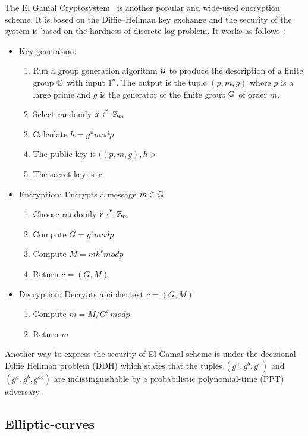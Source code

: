 The El Gamal Cryptosystem~\cite{el_gamal} is another popular and wide-used encryption scheme. It is based on the Diffie–Hellman key exchange and the security of the system is based on the hardness of discrete log problem. It works as follows~\cite{Katz:2014:IMC:2700550, kiagias:crypto}:

\begin{itemize}
  \item Key generation:
    \begin{enumerate}
        \item Run a group generation algorithm $\mathcal{G}$ to produce the description of a finite group $\mathbb{G}$ with input $1^{n}$. The output is the tuple $(p, m, g)$ where $p$ is a large prime and $g$ is the generator of the finite group $\mathbb{G}$ of order $m$.
        \item Select randomly $x \xleftarrow{\mathtt{r}}{\mathbb{Z}_m}$
        \item Calculate $h = g^{x}modp$
        \item The public key is $((p, m, g), h>$
        \item The secret key is $x$
    \end{enumerate}
  \item Encryption: Encrypts a message $m \in \mathbb{G}$
    \begin{enumerate}
      \item Choose randomly $r \xleftarrow{\mathtt{r}}{\mathbb{Z}_m}$
      \item Compute $G = g^{r}modp$
      \item Compute $M = mh^{r}modp$
      \item Return $c = (G, M)$
    \end{enumerate}
  \item Decryption: Decrypts a ciphertext $c = (G, M)$
    \begin{enumerate}
      \item Compute $m = M / G^{x} modp$
      \item Return $m$
    \end{enumerate}
\end{itemize}

Another way to express the security of El Gamal scheme is under the decisional Diffie Hellman problem (DDH) which states that the tuples $(g^a, g^b, g^c)$ and $(g^a, g^b, g^{ab})$ are indistinguishable by a probabilistic polynomial-time (PPT) adversary.

\subsection{Elliptic-curves}
\label{preliminaries:pub:el_curves}

